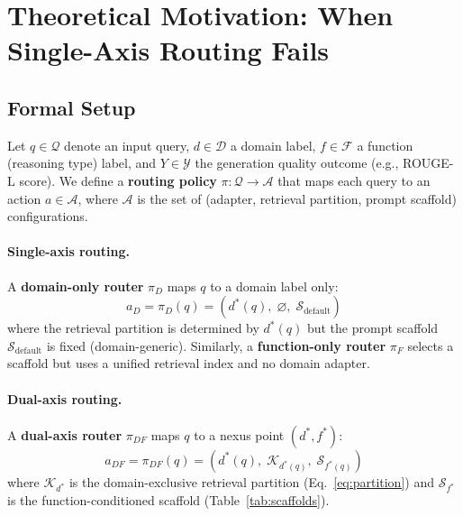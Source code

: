 
\section{Theoretical Motivation: When Single-Axis Routing Fails}
\label{sec:theory}

\subsection{Formal Setup}
\label{ssec:theory_setup}

Let $q \in \mathcal{Q}$ denote an input query, $d \in \mathcal{D}$ a domain label,
$f \in \mathcal{F}$ a function (reasoning type) label, and
$Y \in \mathcal{Y}$ the generation quality outcome (e.g., ROUGE-L score).
We define a \textbf{routing policy} $\pi: \mathcal{Q} \to \mathcal{A}$ that maps each
query to an action $a \in \mathcal{A}$, where $\mathcal{A}$ is the set of
(adapter, retrieval partition, prompt scaffold) configurations.

\paragraph{Single-axis routing.}
A \textbf{domain-only router} $\pi_D$ maps $q$ to a domain label only:
\begin{equation}
    a_D = \pi_D(q) = (d^*(q),\; \varnothing,\; \mathcal{S}_{\text{default}})
    \label{eq:single_axis}
\end{equation}
where the retrieval partition is determined by $d^*(q)$ but the prompt scaffold
$\mathcal{S}_{\text{default}}$ is fixed (domain-generic). Similarly, a
\textbf{function-only router} $\pi_F$ selects a scaffold but uses a unified retrieval
index and no domain adapter.

\paragraph{Dual-axis routing.}
A \textbf{dual-axis router} $\pi_{DF}$ maps $q$ to a nexus point $(d^*, f^*)$:
\begin{equation}
    a_{DF} = \pi_{DF}(q) = (d^*(q),\; \mathcal{K}_{d^*(q)},\; \mathcal{S}_{f^*(q)})
    \label{eq:dual_axis}
\end{equation}
where $\mathcal{K}_{d^*}$ is the domain-exclusive retrieval partition (Eq.~\ref{eq:partition})
and $\mathcal{S}_{f^*}$ is the function-conditioned scaffold (Table~\ref{tab:scaffolds}).

